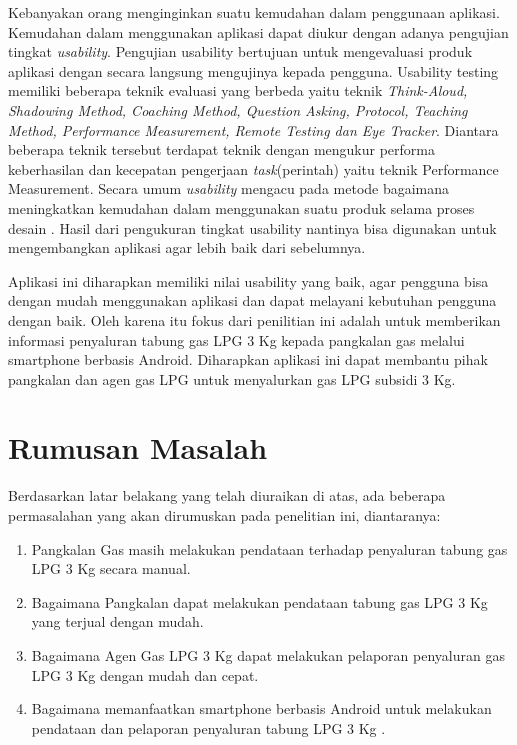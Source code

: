 \par Kebanyakan orang menginginkan suatu kemudahan dalam penggunaan aplikasi. Kemudahan dalam menggunakan aplikasi dapat diukur dengan adanya pengujian tingkat \textit{usability}. Pengujian usability bertujuan untuk mengevaluasi produk aplikasi dengan secara langsung mengujinya kepada pengguna. Usability testing memiliki beberapa teknik evaluasi yang berbeda yaitu teknik \textit{Think-Aloud, Shadowing Method, Coaching Method, Question Asking, Protocol, Teaching Method, Performance Measurement, Remote Testing dan Eye Tracker}. Diantara beberapa teknik tersebut terdapat teknik dengan mengukur performa keberhasilan dan kecepatan pengerjaan \textit{task}(perintah) yaitu teknik Performance Measurement. Secara umum \textit{usability} mengacu pada metode bagaimana meningkatkan kemudahan dalam menggunakan suatu produk selama proses desain \cite{nielsen2012}. Hasil dari pengukuran tingkat usability nantinya bisa digunakan untuk mengembangkan aplikasi agar lebih baik dari sebelumnya.
\par Aplikasi ini diharapkan memiliki nilai usability yang baik, agar pengguna bisa dengan mudah menggunakan aplikasi dan dapat melayani kebutuhan pengguna dengan baik. Oleh karena itu fokus dari penilitian ini adalah untuk memberikan informasi penyaluran tabung gas LPG 3 Kg kepada pangkalan gas melalui smartphone berbasis Android. Diharapkan aplikasi ini dapat membantu pihak pangkalan dan agen gas LPG untuk menyalurkan gas LPG subsidi 3 Kg.


\section{Rumusan Masalah}
Berdasarkan latar belakang yang telah diuraikan di atas, ada beberapa permasalahan yang akan dirumuskan pada penelitian ini, diantaranya:
\begin{enumerate}
	\item Pangkalan Gas masih melakukan pendataan terhadap penyaluran tabung gas LPG 3 Kg secara manual.
	\item Bagaimana Pangkalan dapat melakukan pendataan tabung gas LPG 3 Kg yang terjual dengan mudah.
	\item Bagaimana Agen Gas LPG 3 Kg dapat melakukan pelaporan penyaluran gas LPG 3 Kg dengan mudah dan cepat.
	\item Bagaimana memanfaatkan smartphone berbasis Android untuk melakukan pendataan dan pelaporan penyaluran tabung LPG 3 Kg .
\end{enumerate}

